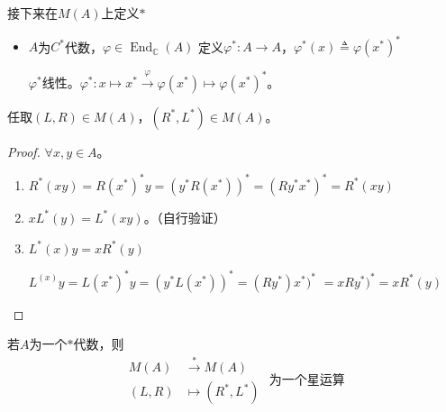 \documentclass[lang=cn,a4paper,newtx,section]{elegantbook}
\begin{document}
接下来在$M(A)$上定义$*$

\begin{itemize}
  \item $A$为$C^*$代数，$\varphi \in \operatorname{End}_{\mathbb{C}}(A)$ 定义$\varphi^*: A \longrightarrow A$，$\varphi^*(x) \triangleq \varphi(x^*)^*$
  
  $\varphi^*$线性。$\varphi^*: x \longmapsto x^* \xrightarrow{\varphi} \varphi(x^*) \longmapsto \varphi(x^*)^*$。
\end{itemize}

\begin{proposition}
  任取$(L, R) \in M(A)$，$(R^*, L^*) \in M(A)$。
\end{proposition}

\begin{proof}
  $\forall x, y \in A$。
  
  \begin{enumerate}
    \item $R^*(xy) = R(x^*)^*y = (y^*R(x^*))^* = (Ry^*x^*)^* = R^*(xy)$
    
    \item $xL^*(y) = L^*(xy)$。（自行验证）
    
    \item $L^*(x)y = xR^*(y)$
    
    $L^{(x)}y = L(x^*)^*y = (y^*L(x^*))^* = (Ry^*)x^*)^*$
    $= xRy^*)^* = xR^*(y)$
  \end{enumerate}
\end{proof}

\begin{proposition}
  若$A$为一个$*$代数，则
  \begin{equation*}
    \begin{aligned}
      M(A) &\xrightarrow{*} M(A) \\
      (L, R) &\longmapsto (R^*, L^*)
    \end{aligned}\text{ 为一个星运算} 
  \end{equation*}
\end{proposition}
\end{document}

